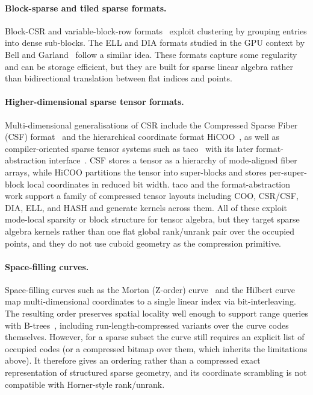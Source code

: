 \documentclass[manuscript,screen,review]{acmart}
\theoremstyle{definition}
\theoremstyle{plain}
\begin{document}
\paragraph{Block-sparse and tiled sparse formats.}
Block-CSR and variable-block-row formats~\cite{ImYelickVuduc2004,Vuduc2005}
exploit clustering by grouping entries into dense sub-blocks. The ELL
and DIA formats studied in the GPU context by Bell and Garland~\cite{BellGarland2009}
follow a similar idea. These formats capture some regularity and can be
storage efficient, but they are built for sparse linear algebra rather
than bidirectional translation between flat indices and points.

\paragraph{Higher-dimensional sparse tensor formats.}
Multi-dimensional generalisations of CSR include the Compressed Sparse
Fiber (CSF) format~\cite{SmithKarypis2015} and the hierarchical
coordinate format HiCOO~\cite{LiSunVuduc2018}, as well as
compiler-oriented sparse tensor systems such as
taco~\cite{KjolstadKamilChouLugatoAmarasinghe2017} with its later
format-abstraction interface~\cite{ChouKjolstadAmarasinghe2018}. CSF
stores a tensor as a hierarchy of mode-aligned fiber arrays, while
HiCOO partitions the tensor into super-blocks and stores
per-super-block local coordinates in reduced bit width. taco and the
format-abstraction work support a family of compressed tensor layouts
including COO, CSR/CSF, DIA, ELL, and HASH and generate kernels across
them. All of these exploit mode-local sparsity or block structure for
tensor algebra, but they target sparse algebra kernels rather than one
flat global rank/unrank pair over the occupied points, and they do not
use cuboid geometry as the compression primitive.

\paragraph{Space-filling curves.}
Space-filling curves such as the Morton (Z-order)
curve~\cite{Morton1966,GaedeGuenther1998} and the Hilbert curve map multi-dimensional
coordinates to a single linear index via bit-interleaving. The
resulting order preserves spatial locality well enough to support
range queries with B\nobreakdash-trees~\cite{LawderKing2001,TropfHerzog1981},
including run-length-compressed variants over the curve codes
themselves.
However, for a sparse subset the curve still requires an explicit list
of occupied codes (or a compressed bitmap over them, which inherits
the limitations above). It therefore gives an ordering rather than a
compressed exact representation of structured sparse geometry, and its
coordinate scrambling is not compatible with Horner-style rank/unrank.
\end{document}
